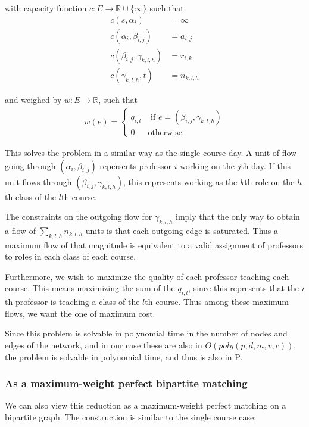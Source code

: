 with capacity function $c:E \to \mathbb{R} \cup \{\infty\}$ such that
\begin{align*}
  c(s, \alpha_i) &= \infty\\
  c(\alpha_i, \beta_{i, j}) &= a_{i, j}\\
  c(\beta_{i, j}, \gamma_{k, l, h}) &= r_{i, k}\\
  c(\gamma_{k, l, h}, t) &= n_{k, l, h}
\end{align*}

and weighed by $w:E \to \mathbb{R}$, such that
\begin{align*}
  w(e) = \begin{cases}
    q_{i, l} & \text{ if } e = (\beta_{i, j}, \gamma_{k, l, h})\\
    0 & \text{otherwise}
  \end{cases}
\end{align*}

This solves the problem in a similar way as the single course day. A unit of flow going through $(\alpha_i, \beta_{i, j})$ repersents professor $i$ working on the $j$th day. If this unit flows through $(\beta_{i, j}, \gamma_{k, l, h})$, this represents working as the $k$th role on the $h$th class of the $l$th course.

The constraints on the outgoing flow for $\gamma_{k, l, h}$ imply that the only way to obtain a flow of $\sum_{k, l, h} n_{k, l, h}$ units is that each outgoing edge is saturated. Thus a maximum flow of that magnitude is equivalent to a valid assignment of professors to roles in each class of each course.

Furthermore, we wish to maximize the quality of each professor teaching each course. This means maximizing the sum of the $q_{i, l}$, since this represents that the $i$th professor is teaching a class of the $l$th course. Thus among these maximum flows, we want the one of maximum cost.

Since this problem is solvable in polynomial time in the number of nodes and edges of the network, and in our case these are also in $O(poly(p, d, m, v, c))$, the problem is solvable in polynomial time, and thus is also in \textsc{P}.


\subsubsection{As a maximum-weight perfect bipartite matching}
We can also view this reduction as a maximum-weight perfect matching on a bipartite graph. The construction is similar to the single course case:

